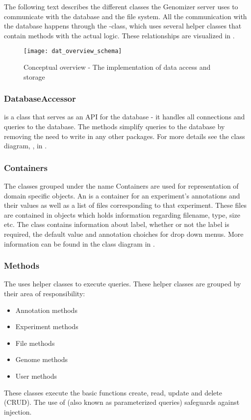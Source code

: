 The following text describes the different classes the Genomizer server uses to communicate with the database and the file system. All the communication with the database happens through the -class, which uses several helper classes that contain methods with the actual logic. These relationships are visualized in . 

\begin{figure}[h!]
	\centering
	\texttt{[image: dat\_overview\_schema]}
\caption{Conceptual overview - The implementation of data access and storage}
\label{fig:dat_overview_schema}
\end{figure}

\subsubsection{DatabaseAccessor}
 is a class that serves as an API for the  database - it handles all connections and queries to the database. The methods simplify queries to the database by removing the need to write  in any other packages. For more details see the class diagram, , in .

\subsubsection{Containers}
The classes grouped under the name Containers are used for representation of domain specific objects. An  is a container for an experiment's annotations and their values as well as a list of files corresponding to that experiment. These files are contained in  objects which holds information regarding filename, type, size etc. The  class contains information about label, whether or not the label is required, the default value and annotation choiches for drop down menus. More information can be found in the class diagram  in .

\subsubsection{Methods}
The  uses helper classes to execute  queries. These helper classes are grouped by their area of responsibility:
\begin{itemize}
\item Annotation methods
\item Experiment methods
\item File methods
\item Genome methods
\item User methods
\end{itemize}
These classes execute the basic  functions create, read, update and delete (CRUD). The use of  (also known as parameterized queries) safeguards against  injection.

